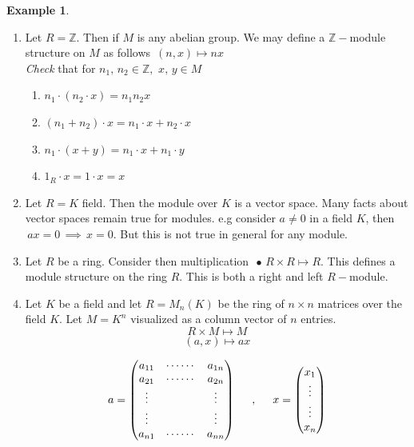 \documentclass[11pt,a4paper]{article}
\theoremstyle{definition}
\newtheorem{exa}[thm]{Example}
\begin{document}
\begin{exa}
\begin{enumerate}
\item Let $R = \mathbb{Z}$. Then if $M$ is any abelian group. We may define a $\mathbb{Z}-$module structure on $M$ as follows $\, (n,x) \longmapsto nx$\\
\textit{Check} that for $n_1,\, n_2\in \mathbb{Z},\,\, x,\, y\in M $
\begin{enumerate}
      \item[(i)] $n_1\cdot (n_2\cdot x) = n_1 n_2 x$
      \item[(ii)] $(n_1 + n_2)\cdot x = n_1\cdot x + n_2\cdot x$
      \item[(iii)] $n_1\cdot (x+ y) = n_1\cdot x + n_1 \cdot y$
      \item[(iv)] $1_R\cdot x = 1\cdot x = x$\\
\end{enumerate}



\item Let $R = K$ field. Then the module over $K$ is  a vector space. Many facts about vector spaces remain true for modules. e.g consider $a\neq 0$ in a field $K$, then $\, ax = 0\, \implies \, x = 0$. But this is not true in general for any module.


\item Let $R$ be a ring. Consider then multiplication $\, \bullet\, R\times R \longmapsto R$. This defines a  module structure on the ring $R$. This is both a right and left $R-$module.


\item Let $K$ be a field and let $R = M_n(K)$ be the ring of $n\times n$ matrices over the field $K$. Let $M = K^n$ visualized as a column vector of $n$ entries.
$$R\times M \longmapsto M$$
$$(a,x) \longmapsto ax$$

$$a = \begin{pmatrix}
a_{11} & \cdots\cdots & a_{1n}\\
a_{21} & \cdots\cdots & a_{2n}\\
\vdots &              & \vdots\\
\vdots &              & \vdots\\
a_{n1} & \cdots\cdots & a_{nn}\\
\end{pmatrix} \hspace{0.5cm},\hspace{0.5cm}
x = \begin{pmatrix}
x_1\\
\vdots\\
\vdots\\
x_n\\
\end{pmatrix}$$\\




\end{enumerate}
\end{exa}
\end{document}
